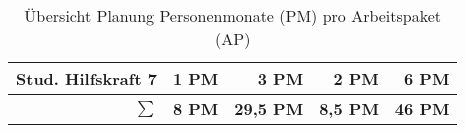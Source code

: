 \begin{table}[]
\begin{tabular}{rrrrr}
        Stud. Hilfskraft 7 & 1 PM                                        & 3 PM                                        & 2 PM                                        & \textbf{6 PM}                                           \\
        \midrule
        \textbf{$\sum$}    & \textbf{8 PM}                               & \textbf{29,5 PM}                            & \textbf{8,5 PM}                             & \textbf{46 PM}                                          \\
        \bottomrule
    \end{tabular}
    \caption{Übersicht Planung Personenmonate (PM) pro Arbeitspaket (AP)}
    \label{tab:menschen}
\end{table}
